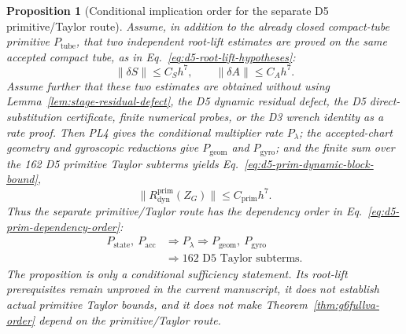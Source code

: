 \documentclass[preprint,12pt]{elsarticle}
\newtheorem{proposition}{Proposition}
\begin{document}
\begin{proposition}[Conditional implication order for the separate D5 primitive/Taylor route]
\label{prop:d5-primitive-taylor-conditional-implication}
Assume, in addition to the already closed compact-tube primitive
\(P_{\mathrm{tube}}\), that two independent root-lift estimates are proved on
the same accepted compact tube, as in Eq.~\eqref{eq:d5-root-lift-hypotheses}:
\begin{equation}
\label{eq:d5-root-lift-hypotheses}
  \|\delta S\|\le C_Sh^7,\qquad
  \|\delta A\|\le C_Ah^7 .
\end{equation}
Assume further that these two estimates are obtained without using
Lemma~\ref{lem:stage-residual-defect}, the D5 dynamic residual defect, the D5
direct-substitution certificate, finite numerical probes, or the D3
wrench identity as a rate proof.  Then PL4 gives the conditional multiplier
rate \(P_{\lambda}\); the accepted-chart geometry and gyroscopic reductions
give \(P_{\mathrm{geom}}\) and \(P_{\mathrm{gyro}}\); and the finite sum over
the 162 D5 primitive Taylor subterms yields
Eq.~\eqref{eq:d5-prim-dynamic-block-bound},
\begin{equation}
\label{eq:d5-prim-dynamic-block-bound}
  \|R_{\mathrm{dyn}}^{\mathrm{prim}}(Z_G)\|
  \le C_{\mathrm{prim}}h^7 .
\end{equation}
Thus the separate primitive/Taylor route has the dependency order
in Eq.~\eqref{eq:d5-prim-dependency-order}:
\begin{equation}
\label{eq:d5-prim-dependency-order}
\begin{aligned}
  P_{\mathrm{state}},\ P_{\mathrm{acc}}
  &\Rightarrow P_{\lambda}
  \Rightarrow P_{\mathrm{geom}},\ P_{\mathrm{gyro}}\\
  &\Rightarrow \text{162 D5 Taylor subterms}.
\end{aligned}
\end{equation}
The proposition is only a conditional sufficiency statement.  Its root-lift
prerequisites remain unproved in the current manuscript, it does not establish
actual primitive Taylor bounds, and it does not
make Theorem~\ref{thm:g6fullva-order} depend on the primitive/Taylor route.
\end{proposition}
\end{document}
